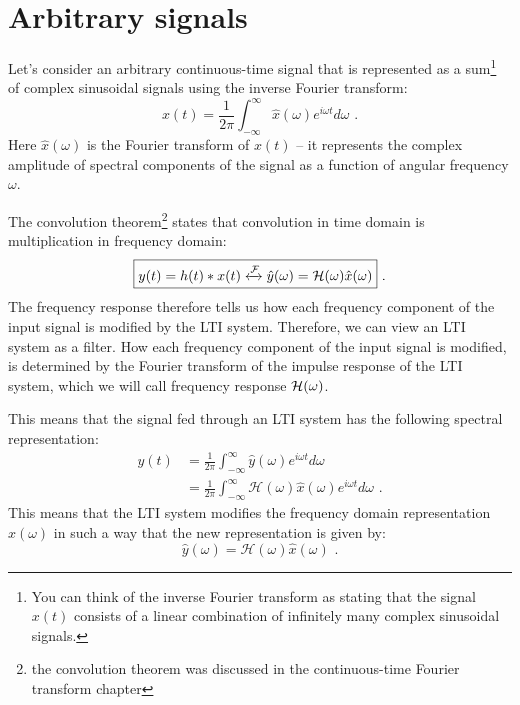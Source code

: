 


\section{Arbitrary signals}

Let's consider an arbitrary continuous-time signal that is represented
as a sum\footnote{You can think of the inverse Fourier transform as stating
that the signal $x(t)$ consists of a linear combination of infinitely many
complex sinusoidal signals.} of complex sinusoidal signals using the inverse Fourier transform:
\begin{equation}
x(t)  = \frac{1}{2\pi} \int_{-\infty}^{\infty} \hat{x}(\omega) e^{i \omega t} d\omega \,\,.
\end{equation}
Here $\hat{x}(\omega)$ is the Fourier transform of $x(t)$ -- it
represents the complex amplitude of spectral components of the signal
as a function of angular frequency $\omega$.

The convolution theorem\footnote{the convolution theorem was discussed
in the continuous-time Fourier transform chapter} states that
convolution in time domain is multiplication in frequency domain:
\begin{equation}
\boxed{
y(t) = h(t)*x(t) \xleftrightarrow{\mathcal{F}} \hat{y}(\omega)=\mathcal{H}(\omega)\hat{x}(\omega)
} \,\,.
\end{equation}
The frequency response therefore tells us how each frequency component
of the input signal is modified by the LTI system. Therefore, we can view an LTI system as a filter. How each frequency component of the input signal is modified, is determined by the Fourier transform of the impulse response of the LTI system, which we will call  frequency response $\mathcal{H}(\omega)$.


This means that the signal fed through an LTI system has the following spectral representation:
\begin{align}
y(t)  &= \frac{1}{2\pi} \int_{-\infty}^{\infty} \hat{y}(\omega) e^{i \omega t} d\omega\\
      &= \frac{1}{2\pi} \int_{-\infty}^{\infty} \mathcal{H}(\omega)\hat{x}(\omega) e^{i \omega t} d\omega \,\,.
\end{align}
This means that the LTI system modifies the frequency domain representation
$\hat{x}(\omega)$ in such a way that the new representation is given by:
\begin{equation}
\boxed{
\hat{y}(\omega) = \mathcal{H}(\omega)\hat{x}(\omega)
} \,\,.
\end{equation}
\fi


